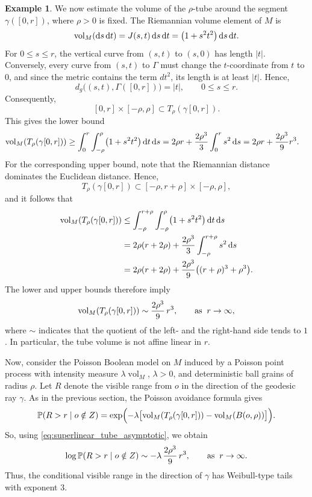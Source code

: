 \documentclass[11pt,a4paper]{article}
\theoremstyle{plain}
\theoremstyle{definition}
\newtheorem{example}[theorem]{Example}
\theoremstyle{remark}
\newcommand{\dint}{\textup{d}}
\newcommand{\vol}{\mathop{\mathrm{vol}}\nolimits}
\def\PP{\mathbb{P}}
\begin{document}
\begin{example}
We now estimate the volume of the \(\rho\)-tube around the segment
\(\gamma([0,r])\), where \(\rho>0\) is fixed. The Riemannian volume element of $M$ is
\[
\vol_M(\dint s\,\dint t)=J(s,t)\,\dint s\,\dint t
=
\bigl(1+s^2t^2\bigr)\,\dint s\,\dint t .
\]
For \(0\leq s\leq r\), the vertical curve from \((s,t)\) to \((s,0)\) has
length \(|t|\). Conversely, every curve from \((s,t)\) to \(\Gamma\) must
change the \(t\)-coordinate from \(t\) to \(0\), and since the metric contains
the term \(dt^2\), its length is at least \(|t|\). Hence,
\[
d_g\bigl((s,t),\Gamma([0,r])\bigr)=|t|,
\qquad 0\leq s\leq r.
\]
Consequently,
\[
[0,r]\times[-\rho,\rho]
\subset
T_\rho(\gamma[0,r]).
\]
This gives the lower bound
\[
\begin{aligned}
	\vol_M(T_\rho(\gamma[0,r]))
	&\geq
	\int_0^r\int_{-\rho}^{\rho}
	\bigl(1+s^2t^2\bigr)\,\dint t\,\dint s  =
	2\rho r+{2\rho^3\over 3}\int_0^r s^2\,\dint s  =
	2\rho r+{2\rho^3\over 9}r^3 .
\end{aligned}
\]
For the corresponding upper bound, note that the Riemannian distance dominates
the Euclidean distance. Hence,
\[
T_\rho(\gamma[0,r])
\subset
[-\rho,r+\rho]\times[-\rho,\rho],
\]
and it follows that
\[
\begin{aligned}
	\vol_M(T_\rho(\gamma[0,r]))
	&\leq
	\int_{-\rho}^{r+\rho}\int_{-\rho}^{\rho}
	\bigl(1+s^2t^2\bigr)\,\dint t\,\dint s  \\
	&=
	2\rho(r+2\rho)
	+
	{2\rho^3\over 3}
	\int_{-\rho}^{r+\rho}s^2\,\dint s  \\
	&=
	2\rho(r+2\rho)
	+
	{2\rho^3\over 9}
	\bigl((r+\rho)^3+\rho^3\bigr).
\end{aligned}
\]
The lower and upper bounds therefore imply
\begin{equation}\label{eq:superlinear_tube_asymptotic}
	\vol_M(T_\rho(\gamma[0,r]))
	\sim
	{2\rho^3\over 9}\,r^3,
	\qquad\text{as}\;\; r\to\infty,
\end{equation}
where $\sim$ indicates that the quotient of the left- and the right-hand side tends to $1$. In particular, the tube volume is not affine linear in \(r\).

Now, consider the Poisson Boolean model on \(M\) induced by a Poisson point process with intensity measure
\(\lambda\vol_M\), $\lambda>0$, and deterministic ball grains of radius \(\rho\). Let \(R\)
denote the visible range from \(o\) in the direction of the geodesic ray
\(\gamma\). As in the previous section, the Poisson avoidance formula gives
\[
\PP(R>r\mid o\notin Z)
=
\exp\Bigl(
-\lambda\bigl[
\vol_M(T_\rho(\gamma[0,r]))
-
\vol_M(B(o,\rho))
\bigr]
\Bigr).
\]
So, using \eqref{eq:superlinear_tube_asymptotic}, we obtain
\[
\log \PP(R>r\mid o\notin Z)
\sim
-\lambda\,{2\rho^3\over 9}\,r^3,
\qquad\text{as}\;\; r\to\infty .
\]
Thus, the conditional visible range in the direction of $\gamma$ has Weibull-type tails with exponent
\(3\). 
\end{example}
\end{document}

